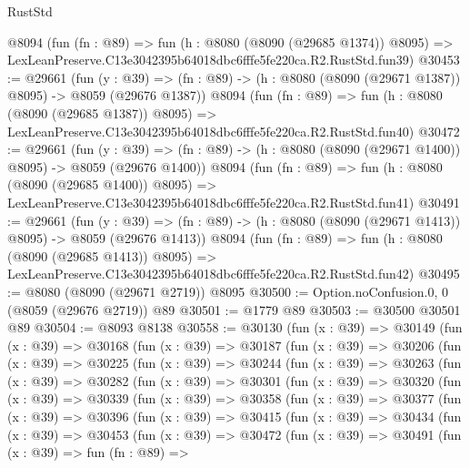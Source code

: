 \begin{lexlean}{RustStd}
\begin{coremodule}
    @8094
    (fun (fn : @89) =>
    fun (h : @8080 (@8090 (@29685 @1374)) @8095) =>
    LexLeanPreserve.C13e3042395b64018dbc6fffe5fe220ca.R2.RustStd.fun39)
@30453 := @29661
    (fun (y : @39) =>
    (fn : @89) -> (h : @8080 (@8090 (@29671 @1387)) @8095) -> @8059 (@29676 @1387))
    @8094
    (fun (fn : @89) =>
    fun (h : @8080 (@8090 (@29685 @1387)) @8095) =>
    LexLeanPreserve.C13e3042395b64018dbc6fffe5fe220ca.R2.RustStd.fun40)
@30472 := @29661
    (fun (y : @39) =>
    (fn : @89) -> (h : @8080 (@8090 (@29671 @1400)) @8095) -> @8059 (@29676 @1400))
    @8094
    (fun (fn : @89) =>
    fun (h : @8080 (@8090 (@29685 @1400)) @8095) =>
    LexLeanPreserve.C13e3042395b64018dbc6fffe5fe220ca.R2.RustStd.fun41)
@30491 := @29661
    (fun (y : @39) =>
    (fn : @89) -> (h : @8080 (@8090 (@29671 @1413)) @8095) -> @8059 (@29676 @1413))
    @8094
    (fun (fn : @89) =>
    fun (h : @8080 (@8090 (@29685 @1413)) @8095) =>
    LexLeanPreserve.C13e3042395b64018dbc6fffe5fe220ca.R2.RustStd.fun42)
@30495 := @8080 (@8090 (@29671 @2719)) @8095
@30500 := Option.noConfusion.{0, 0} (@8059 (@29676 @2719)) @89
@30501 := @1779 @89
@30503 := @30500 @30501 @89
@30504 := @8093 @8138
@30558 := @30130
    (fun (x : @39) =>
    @30149
      (fun (x : @39) =>
      @30168
        (fun (x : @39) =>
        @30187
          (fun (x : @39) =>
          @30206
            (fun (x : @39) =>
            @30225
              (fun (x : @39) =>
              @30244
                (fun (x : @39) =>
                @30263
                  (fun (x : @39) =>
                  @30282
                    (fun (x : @39) =>
                    @30301
                      (fun (x : @39) =>
                      @30320
                        (fun (x : @39) =>
                        @30339
                          (fun (x : @39) =>
                          @30358
                            (fun (x : @39) =>
                            @30377
                              (fun (x : @39) =>
                              @30396
                                (fun (x : @39) =>
                                @30415
                                  (fun (x : @39) =>
                                  @30434
                                    (fun (x : @39) =>
                                    @30453
                                      (fun (x : @39) =>
                                      @30472
                                        (fun (x : @39) =>
                                        @30491
                                          (fun (x : @39) =>
                                          fun (fn : @89) =>

\end{coremodule}
\end{lexlean}
